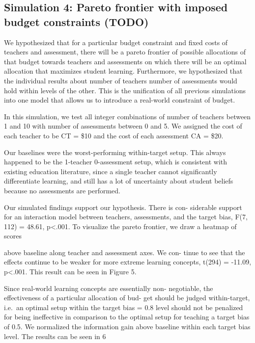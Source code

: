 \documentclass[10pt, letterpaper]{article}
\begin{document}
\subsection{Simulation 4: Pareto frontier with imposed budget
constraints
(TODO)}\label{simulation-4-pareto-frontier-with-imposed-budget-constraints-todo}

We hypothesized that for a particular budget constraint and fixed costs
of teachers and assessment, there will be a pareto frontier of possible
allocations of that budget towards teachers and assessments on which
there will be an optimal allocation that maximizes student learning.
Furthermore, we hypothesized that the individual results about number of
teachers number of assessments would hold within levels of the other.
This is the unification of all previous simulations into one model that
allows us to introduce a real-world constraint of budget.

In this simulation, we test all integer combinations of number of
teachers between 1 and 10 with number of assessments between 0 and 5. We
assigned the cost of each teacher to be CT = \$10 and the cost of each
assessment CA = \$20.

Our baselines were the worst-performing within-target setup. This always
happened to be the 1-teacher 0-assessment setup, which is consistent
with existing education literature, since a single teacher cannot
significantly differentiate learning, and still has a lot of uncertainty
about student beliefs because no assessments are performed.

Our simulated findings support our hypothesis. There is con- siderable
support for an interaction model between teachers, assessments, and the
target bias, F(7, 112) = 48.61, p\textless{}.001. To visualize the
pareto frontier, we draw a heatmap of scores

above baseline along teacher and assessment axes. We con- tinue to see
that the effects continue to be weaker for more extreme learning
concepts, t(294) = -11.09, p\textless{}.001. This result can be seen in
Figure 5.

Since real-world learning concepts are essentially non- negotiable, the
effectiveness of a particular allocation of bud- get should be judged
within-target, i.e.~an optimal setup within the target bias = 0.8 level
should not be penalized for being ineffective in comparison to the
optimal setup for teaching a target bias of 0.5. We normalized the
information gain above baseline within each target bias level. The
results can be seen in 6
\end{document}
